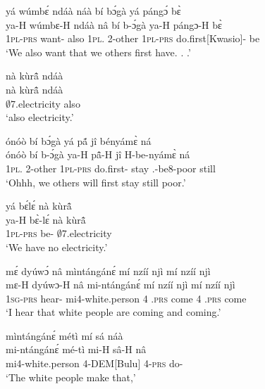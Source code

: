 \begin{exe}[(C234)]  
\exC\label{151} 
  \glll  yá wúmbɛ́ ndáà náà bí bɔ́gà yá pángɔ́ bɛ̀ \\
         ya-H wúmbɛ-H ndáà nâ bí b-ɔ́gà ya-H pángɔ-H bɛ̀ \\
        1\textsc{pl}-\textsc{prs} want-{\R} also {\COMP} 1\textsc{pl}.{\SBJ}  2-other 1\textsc{pl}-\textsc{prs}  do.first[Kwasio]-{\R} be  \\
    \trans `We also want that we others first have. . .'
 
\exC\label{152} 
  \glll nà kùrã̂ ndáà \\
       nà kùrã̂ ndáà \\
         {\COM} $\emptyset$7.electricity also   \\
    \trans `also electricity.'
 
\exC\label{153} 
  \glll  ónóò bí bɔ́gà yá pã́ jî bényámɛ̀ ná \\
         ónóò bí b-ɔ́gà ya-H pã̂-H jî H-be-nyámɛ̀ ná \\
         {\EXCL} 1\textsc{pl}.{\SBJ}  2-other 1\textsc{pl}-\textsc{prs} do.first-{\R} stay {\OBJ}.{\LINK}-be8-poor still \\
    \trans `Ohhh, we others will first stay still poor.'
 
\exC\label{154}
  \glll  yá bɛ́lɛ́ nà kùrã̂ \\
         ya-H bɛ̀-lɛ́ nà kùrã̂ \\
          1\textsc{pl}-\textsc{prs} be-{\NEG} {\COM} $\emptyset$7.electricity   \\
    \trans `We have no electricity.'
 
\exC\label{155} 
  \glll  mɛ́ dyúwɔ́ nâ mìntángánɛ́ mí nzíí njì mí nzíí njì \\
       mɛ-H dyúwɔ-H nâ mi-ntángánɛ́ mí nzíí njì mí nzíí njì \\
         1\textsc{sg}-\textsc{prs} hear-{\R} {\COMP} mi4-white.person 4 {\PROG}.\textsc{prs} come 4 {\PROG}.\textsc{prs} come   \\
    \trans `I hear that white people are coming and coming.'
 
\exC\label{156} 
  \glll  mìntángánɛ́ métì mí sá náà  \\
         mi-ntángánɛ́ mé-tì mi-H sâ-H nâ  \\
          mi4-white.person 4-DEM[Bulu] 4-\textsc{prs} do-{\R} {\COMP}   \\
    \trans `The white people make that,'
 

\end{exe}
